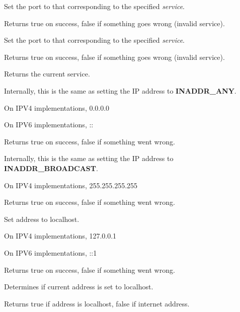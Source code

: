 
Set the port to that corresponding to the specified {\it service}.


Returns true on success, false if something goes wrong
(invalid service).


Set the port to that corresponding to the specified {\it service}.


Returns true on success, false if something goes wrong
(invalid service).


Returns the current service.

%
%

\label{wxIPaddressanyaddress}


Internally, this is the same as setting the IP address
to {\bf INADDR\_ANY}.

On IPV4 implementations, 0.0.0.0

On IPV6 implementations, ::


Returns true on success, false if something went wrong.

%
%

\label{wxipaddressbroadcastaddress}


Internally, this is the same as setting the IP address
to {\bf INADDR\_BROADCAST}.

On IPV4 implementations, 255.255.255.255


Returns true on success, false if something went wrong.

%
%

\label{wxipaddresslocalhost}


Set address to localhost. 

On IPV4 implementations, 127.0.0.1

On IPV6 implementations, ::1


Returns true on success, false if something went wrong.

\label{wxipaddressislocalhost}


Determines if current address is set to localhost. 


Returns true if address is localhost, false if internet address.

